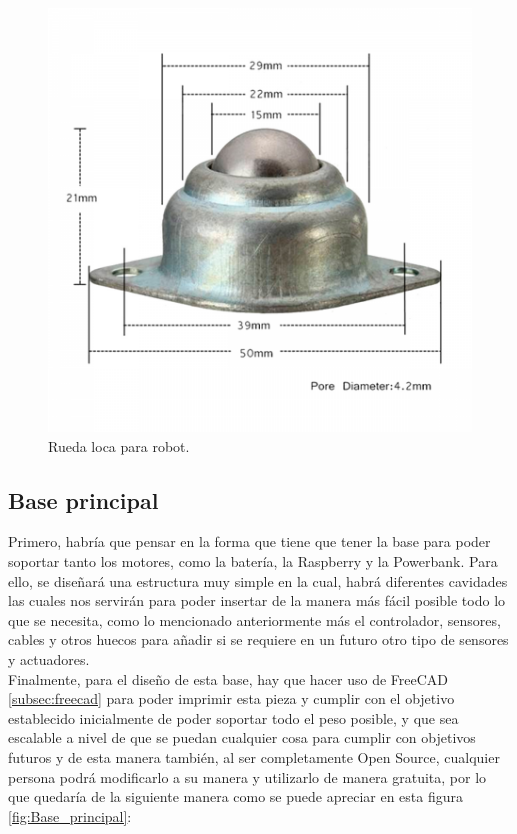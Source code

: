 \begin{figure}[H]
  \centering
  \includegraphics[scale=0.4]{figs/rueda_loca} %
  \caption{Rueda loca para robot.}
  \label{fig:Rueda_loca}
\end{figure}



\subsection{Base principal}
\label{subsec:base_principal}

Primero, habría que pensar en la forma que tiene que tener la base para poder soportar tanto los motores, como la batería, la Raspberry y la Powerbank. Para ello, se diseñará una estructura muy simple en la cual, habrá diferentes cavidades las cuales nos servirán para poder insertar de la manera más fácil posible todo lo que se necesita, como lo mencionado anteriormente más el controlador, sensores, cables y otros huecos para añadir si se requiere en un futuro otro tipo de sensores y actuadores. \\

Finalmente, para el diseño de esta base, hay que hacer uso de FreeCAD \ref{subsec:freecad} para poder imprimir esta pieza y cumplir con el objetivo establecido inicialmente de poder soportar todo el peso posible, y que sea escalable a nivel de que se puedan cualquier cosa para cumplir con objetivos futuros y de esta manera también, al ser completamente Open Source, cualquier persona podrá modificarlo a su manera y utilizarlo de manera gratuita, por lo que quedaría de la siguiente manera como se puede apreciar en esta figura \ref{fig:Base_principal}:

